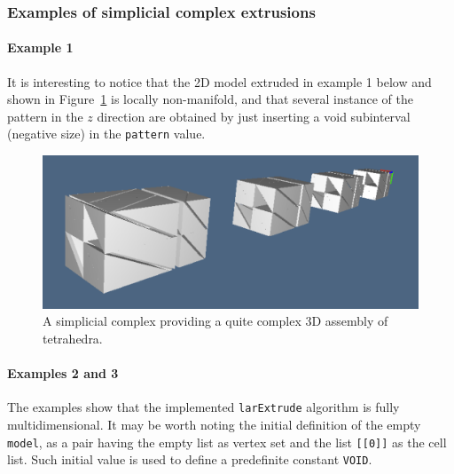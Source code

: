 \documentclass[11pt,oneside]{article}	%
\begin{document}
\subsubsection{Examples of simplicial complex extrusions}

\paragraph{Example 1}
It is interesting to notice that the 2D model extruded in example 1 below and shown in Figure~\ref{fig:assembly} is locally non-manifold, and that several instance of the pattern in the $z$ direction are obtained by just inserting a void subinterval (negative size) in the \texttt{pattern} value.

\begin{figure}[htbp] %
   \centering
   \includegraphics[width=0.7\linewidth]{images/assembly} 
   \caption{A simplicial complex providing a quite complex 3D assembly of tetrahedra.}
   \label{fig:assembly}
\end{figure}

\paragraph{Examples 2 and 3}
The examples show that the implemented \texttt{larExtrude} algorithm is fully multidimensional. 
It may be worth noting the initial definition of the empty \texttt{model}, as a pair having the empty list as vertex set and the list \texttt{[[0]]} as the cell list. Such initial value is used
to define a predefinite constant \texttt{VOID}.
\end{document}
